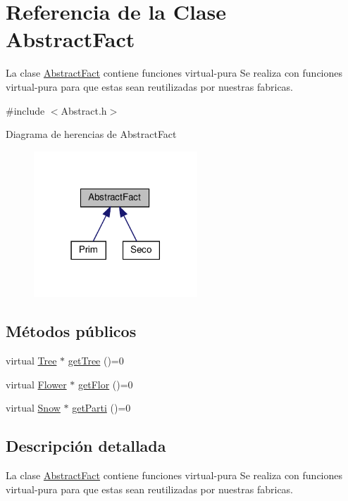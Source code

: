 \hypertarget{classAbstractFact}{}\section{Referencia de la Clase Abstract\+Fact}
\label{classAbstractFact}


La clase \hyperlink{classAbstractFact}{Abstract\+Fact} contiene funciones virtual-\/pura  Se realiza con funciones virtual-\/pura para que estas sean reutilizadas por nuestras fabricas.  




{\ttfamily \#include $<$Abstract.\+h$>$}



Diagrama de herencias de Abstract\+Fact
\nopagebreak
\begin{figure}[H]
\begin{center}
\leavevmode
\includegraphics[width=174pt]{classAbstractFact__inherit__graph}
\end{center}
\end{figure}
\subsection*{Métodos públicos}
\begin{DoxyCompactItemize}
\item 
virtual \hyperlink{classTree}{Tree} $\ast$ \hyperlink{classAbstractFact_a37e763c0a454db79c61f229d33b72c73}{get\+Tree} ()=0
\item 
virtual \hyperlink{classFlower}{Flower} $\ast$ \hyperlink{classAbstractFact_a9ee9f34bc189886b24e325ff2412a1d9}{get\+Flor} ()=0
\item 
virtual \hyperlink{classSnow}{Snow} $\ast$ \hyperlink{classAbstractFact_a7b642a7fe5615f7103dd7d1ab4c801d9}{get\+Parti} ()=0
\end{DoxyCompactItemize}


\subsection{Descripción detallada}
La clase \hyperlink{classAbstractFact}{Abstract\+Fact} contiene funciones virtual-\/pura  Se realiza con funciones virtual-\/pura para que estas sean reutilizadas por nuestras fabricas. 

